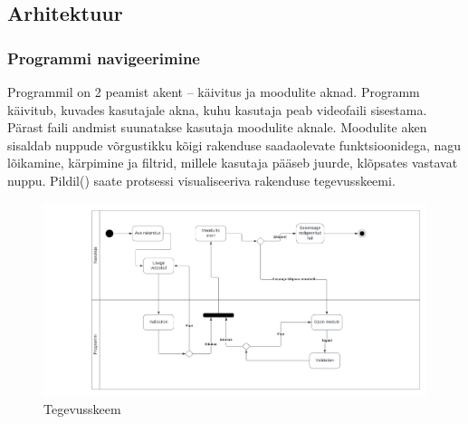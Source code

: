 \subsection{Arhitektuur}
\subsubsection{Programmi navigeerimine}
Programmil on 2 peamist akent – käivitus ja moodulite aknad. Programm käivitub, kuvades kasutajale akna, kuhu kasutaja peab videofaili sisestama. Pärast faili andmist suunatakse kasutaja moodulite aknale. Moodulite aken sisaldab nuppude võrgustikku kõigi rakenduse saadaolevate funktsioonidega, nagu lõikamine, kärpimine ja filtrid, millele kasutaja pääseb juurde, klõpsates vastavat nuppu. Pildil() saate protsessi visualiseeriva rakenduse tegevusskeemi.
\begin{figure}[H]
    \centering
    \includegraphics[width=1\textwidth]{Images/Projekti Tegevusskeem.png}
    \caption{Tegevusskeem}
    \label{fig:activityDiagram}
\end{figure}
